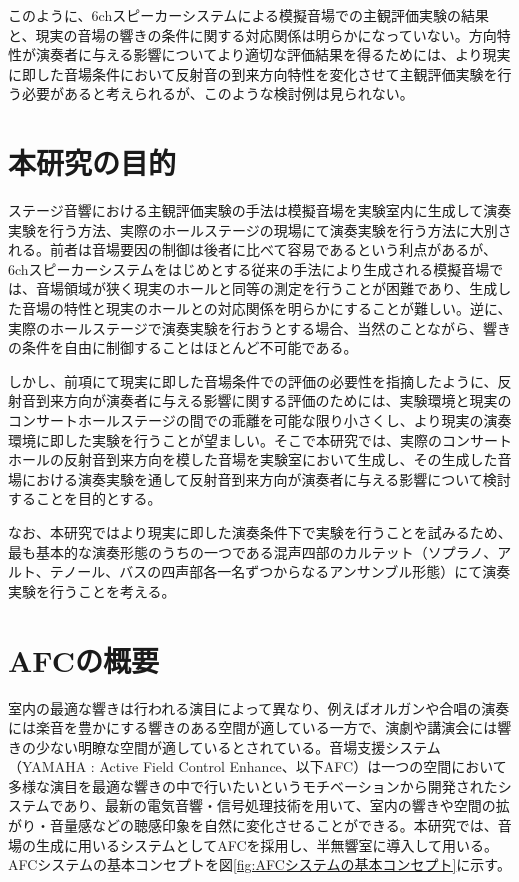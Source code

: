 \documentclass[11pt,a4j]{jreport}
\begin{document}
このように、6chスピーカーシステムによる模擬音場での主観評価実験の結果と、現実の音場の響きの条件に関する対応関係は明らかになっていない。方向特性が演奏者に与える影響についてより適切な評価結果を得るためには、より現実に即した音場条件において反射音の到来方向特性を変化させて主観評価実験を行う必要があると考えられるが、このような検討例は見られない。



\newpage
\section{本研究の目的} %
ステージ音響における主観評価実験の手法は模擬音場を実験室内に生成して演奏実験を行う方法、実際のホールステージの現場にて演奏実験を行う方法に大別される。前者は音場要因の制御は後者に比べて容易であるという利点があるが、6chスピーカーシステムをはじめとする従来の手法により生成される模擬音場では、音場領域が狭く現実のホールと同等の測定を行うことが困難であり、生成した音場の特性と現実のホールとの対応関係を明らかにすることが難しい。逆に、実際のホールステージで演奏実験を行おうとする場合、当然のことながら、響きの条件を自由に制御することはほとんど不可能である。

しかし、前項にて現実に即した音場条件での評価の必要性を指摘したように、反射音到来方向が演奏者に与える影響に関する評価のためには、実験環境と現実のコンサートホールステージの間での乖離を可能な限り小さくし、より現実の演奏環境に即した実験を行うことが望ましい。そこで本研究では、実際のコンサートホールの反射音到来方向を模した音場を実験室において生成し、その生成した音場における演奏実験を通して反射音到来方向が演奏者に与える影響について検討することを目的とする。

なお、本研究ではより現実に即した演奏条件下で実験を行うことを試みるため、最も基本的な演奏形態のうちの一つである混声四部のカルテット（ソプラノ、アルト、テノール、バスの四声部各一名ずつからなるアンサンブル形態）にて演奏実験を行うことを考える。


\section{AFCの概要} %

室内の最適な響きは行われる演目によって異なり、例えばオルガンや合唱の演奏には楽音を豊かにする響きのある空間が適している一方で、演劇や講演会には響きの少ない明瞭な空間が適しているとされている。音場支援システム（YAMAHA : Active Field Control Enhance、以下AFC）は一つの空間において多様な演目を最適な響きの中で行いたいというモチベーションから開発されたシステムであり、最新の電気音響・信号処理技術を用いて、室内の響きや空間の拡がり・音量感などの聴感印象を自然に変化させることができる\cite{AFCの概要}。本研究では、音場の生成に用いるシステムとしてAFCを採用し、半無響室に導入して用いる。AFCシステムの基本コンセプトを図\ref{fig:AFCシステムの基本コンセプト}に示す。
\end{document}
